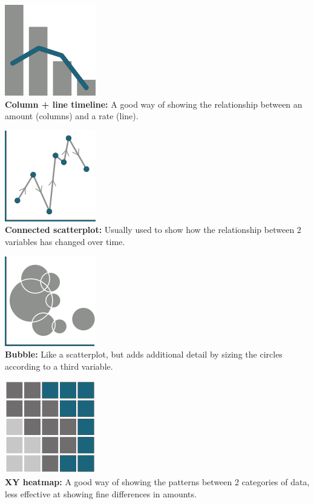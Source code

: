 \documentclass[
  a4paper,
  onecolumn,
  oneside]{book}
\begin{document}
\includegraphics{part1/images/corellation2.png}\\
\textbf{Column + line timeline:} A good way of showing the relationship
between an amount (columns) and a rate (line).

\includegraphics{part1/images/corellation3.png}\\
\textbf{Connected scatterplot:} Usually used to show how the
relationship between 2 variables has changed over time.

\includegraphics{part1/images/corellation4.png}\\
\textbf{Bubble:} Like a scatterplot, but adds additional detail by
sizing the circles according to a third variable.

\includegraphics{part1/images/corellation5.png}\\
\textbf{XY heatmap:} A good way of showing the patterns between 2
categories of data, less effective at showing fine differences in
amounts.
\end{document}
